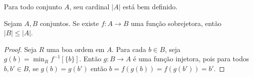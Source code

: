 \begin{corollary}[$ZFC^-$]\label{cor:cardinalBemOrdenavel}
    Para todo conjunto $A$, seu cardinal $|A|$ está bem definido.
\end{corollary}

\begin{corollary}
    Sejam $A, B$ conjuntos.
    Se existe $f: A\to B$ uma função sobrejetora, então $|B|\leq |A|$.
\end{corollary}
\begin{proof}
    Seja $R$ uma boa ordem em $A$.
    Para cada $b\in B$, seja $g(b)=\min_R f^{-1}[\{b\}]$.
    Então $g:B\to A$ é uma função injetora, pois para todos $b, b'\in B$, se $g(b)=g(b')$ então $b=f(g(b))=f(g(b'))=b'$.
\end{proof}
